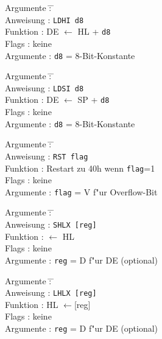 \documentclass[12pt,a4paper,twoside]{report}
\newcommand{\tty}[1]{{\tt #1}}
\begin{document}
{\begin{tabbing}
Argumente         \= : \= \kill \\
Anweisung         \> : \> \tty{LDHI d8} \\
Funktion          \> : \> DE $\leftarrow$ HL + {\tt d8} \\
Flags             \> : \> keine \\
Argumente         \> : \> {\tt d8} = 8-Bit-Konstante \\
\end{tabbing}

\begin{tabbing}
Argumente         \= : \= \kill \\
Anweisung         \> : \> \tty{LDSI d8} \\
Funktion          \> : \> DE $\leftarrow$ SP + {\tt d8} \\
Flags             \> : \> keine \\
Argumente         \> : \> {\tt d8} = 8-Bit-Konstante \\
\end{tabbing}

\begin{tabbing}
Argumente         \= : \= \kill \\
Anweisung         \> : \> \tty{RST flag} \\
Funktion          \> : \> Restart zu 40h wenn {\tt flag}=1 \\
Flags             \> : \> keine \\
Argumente         \> : \> {\tt flag} = V f"ur Overflow-Bit \\
\end{tabbing}

\begin{tabbing}
Argumente         \= : \= \kill \\
Anweisung         \> : \> \tty{SHLX [reg]} \\
Funktion          \> : \> [reg] $\leftarrow$ HL \\
Flags             \> : \> keine \\
Argumente         \> : \> \tty{reg} = D f"ur DE (optional) \\
\end{tabbing}

\begin{tabbing}
Argumente         \= : \= \kill \\
Anweisung         \> : \> \tty{LHLX [reg]} \\
Funktion          \> : \> HL $\leftarrow$[reg] \\
Flags             \> : \> keine \\
Argumente         \> : \> \tty{reg} = D f"ur DE (optional) \\
\end{tabbing}

}
\end{document}
